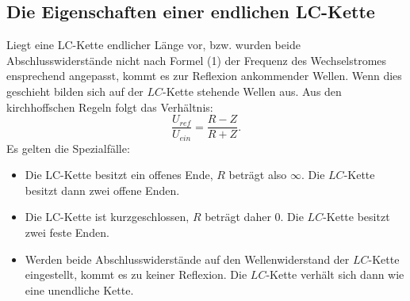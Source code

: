 \subsection{Die Eigenschaften einer endlichen LC-Kette}
Liegt eine LC-Kette endlicher Länge vor, bzw. wurden beide Abschlusswiderstände
 nicht nach Formel (1) der Frequenz des Wechselstromes ensprechend angepasst,
  kommt es zur Reflexion ankommender Wellen. Wenn dies geschieht bilden sich auf der
   $LC$-Kette stehende Wellen aus. Aus den kirchhoffschen Regeln folgt das Verhältnis:
  \begin{equation}
    \frac{U_{ref}}{U_{ein}} = \frac{R-Z}{R+Z}\text{.}
  \end{equation}
  Es gelten die Spezialfälle:\\
\begin{itemize}
  \item Die LC-Kette besitzt ein offenes Ende, $R$ beträgt also $\infty$. Die $LC$-Kette
   besitzt dann zwei offene Enden.\\

  \item Die LC-Kette ist kurzgeschlossen, $R$ beträgt daher 0. Die $LC$-Kette besitzt zwei
  feste Enden.\\

 \item Werden beide Abschlusswiderstände auf den Wellenwiderstand der $LC$-Kette eingestellt,
  kommt es zu keiner Reflexion. Die $LC$-Kette verhält sich dann wie eine unendliche Kette.
\end{itemize}
